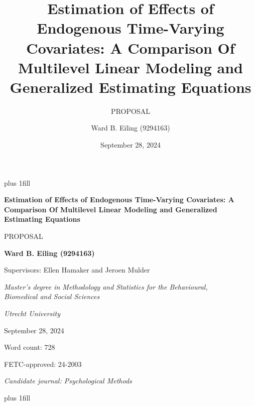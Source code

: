 \documentclass[
  12pt,
  a4paper,
]{article}
\title{Estimation of Effects of Endogenous Time-Varying Covariates: A
Comparison Of Multilevel Linear Modeling and Generalized Estimating
Equations}
\subtitle{PROPOSAL}
\author{Ward B. Eiling (9294163)}
\date{September 28, 2024}
\begin{document}
\cleardoublepage
\thispagestyle{empty}
{\centering
\hbox{}\vskip 0cm plus 1fill
{\Large\bfseries Estimation of Effects of Endogenous Time-Varying
Covariates: A Comparison Of Multilevel Linear Modeling and Generalized
Estimating Equations \par}
\vspace{3ex}
{\large PROPOSAL \par}
\vspace{9ex}
{\large\bfseries Ward B. Eiling (9294163) \par}
\vspace{3ex}
{\large Supervisors: Ellen Hamaker and Jeroen Mulder \par}
\vspace{9ex}
{\normalsize \textit{Master's degree in Methodology and Statistics for the Behavioural, \\ Biomedical and Social Sciences} \par}
\vspace{3ex}
{\normalsize \textit{Utrecht University} \par}
\vspace{9ex}
{\normalsize September 28, 2024 \par}
\vspace{3ex}
{\normalsize Word count: 728 \par}
\vspace{9ex}
{\normalsize FETC-approved: 24-2003 \par}
\vspace{9ex}
{\normalsize \textit{Candidate journal: Psychological Methods} \par}
\hbox{}\vskip 0cm plus 1fill
}


\pagestyle{fancy}
  \fancyhead{}
\end{document}
